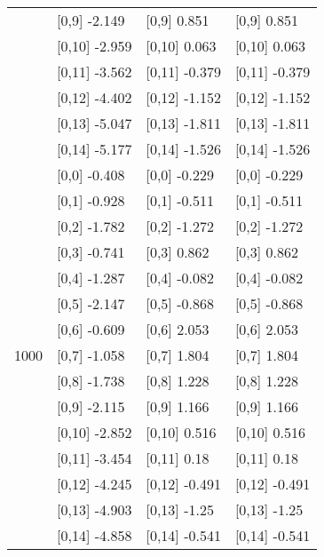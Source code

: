 \begin{table}
\begin{tabular}[t]{llll}
 & {}[0,9] -2.149 & {}[0,9] 0.851 & {}[0,9] 0.851\\
\addlinespace
 & {}[0,10] -2.959 & {}[0,10] 0.063 & {}[0,10] 0.063\\
 & {}[0,11] -3.562 & {}[0,11] -0.379 & {}[0,11] -0.379\\
 & {}[0,12] -4.402 & {}[0,12] -1.152 & {}[0,12] -1.152\\
 & {}[0,13] -5.047 & {}[0,13] -1.811 & {}[0,13] -1.811\\
 & {}[0,14] -5.177 & {}[0,14] -1.526 & {}[0,14] -1.526\\
\addlinespace
 & {}[0,0] -0.408 & {}[0,0] -0.229 & {}[0,0] -0.229\\
 & {}[0,1] -0.928 & {}[0,1] -0.511 & {}[0,1] -0.511\\
 & {}[0,2] -1.782 & {}[0,2] -1.272 & {}[0,2] -1.272\\
 & {}[0,3] -0.741 & {}[0,3] 0.862 & {}[0,3] 0.862\\
 & {}[0,4] -1.287 & {}[0,4] -0.082 & {}[0,4] -0.082\\
\addlinespace
 & {}[0,5] -2.147 & {}[0,5] -0.868 & {}[0,5] -0.868\\
 & {}[0,6] -0.609 & {}[0,6] 2.053 & {}[0,6] 2.053\\
1000 & {}[0,7] -1.058 & {}[0,7] 1.804 & {}[0,7] 1.804\\
 & {}[0,8] -1.738 & {}[0,8] 1.228 & {}[0,8] 1.228\\
 & {}[0,9] -2.115 & {}[0,9] 1.166 & {}[0,9] 1.166\\
\addlinespace
 & {}[0,10] -2.852 & {}[0,10] 0.516 & {}[0,10] 0.516\\
 & {}[0,11] -3.454 & {}[0,11] 0.18 & {}[0,11] 0.18\\
 & {}[0,12] -4.245 & {}[0,12] -0.491 & {}[0,12] -0.491\\
 & {}[0,13] -4.903 & {}[0,13] -1.25 & {}[0,13] -1.25\\
 & {}[0,14] -4.858 & {}[0,14] -0.541 & {}[0,14] -0.541\\
\bottomrule
\end{tabular}
\end{table}

